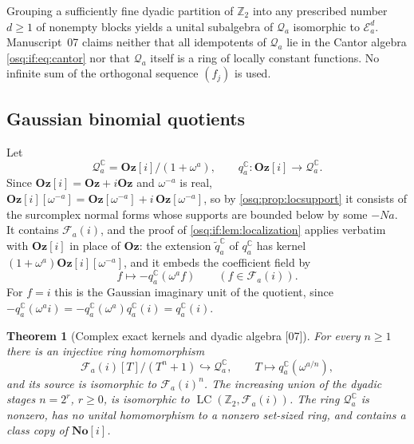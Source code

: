 \documentclass[11pt,letterpaper]{article}
\numberwithin{equation}{section}
\newtheorem{theorem}{Theorem}[section]
\theoremstyle{definition}
\theoremstyle{remark}
\theoremstyle{plain}
\newcommand{\No}{\mathbf{No}}
\newcommand{\Oz}{\mathbf{Oz}}
\newcommand{\SC}{\No[i]}
\newcommand{\GOz}{\Oz[i]}
\newcommand{\Z}{\mathbb Z}
\newcommand{\C}{\mathbb C}
\newcommand{\FF}{\mathscr F}         %
\newcommand{\EE}{\mathscr E}         %
\newcommand{\Qa}{\mathcal Q}         %
\newcommand{\LC}{\operatorname{LC}}
\newcommand{\src}[1]{\textup{\textsf{[#1]}}}
\begin{document}
Grouping a sufficiently fine dyadic partition of $\Z_2$ into any prescribed number $d\ge1$
of nonempty blocks yields a unital subalgebra of $\Qa_a$ isomorphic to $\EE_a^d$.
Manuscript~07 claims neither that all idempotents of $\Qa_a$ lie in the Cantor algebra
\eqref{osq:if:eq:cantor} nor that $\Qa_a$ itself is a ring of locally constant functions.
No infinite sum of the orthogonal sequence $(f_j)$ is used.

\subsection{Gaussian binomial quotients}\label{osq:if:sub:gaussian}

Let
\[
 \Qa_a^\C=\GOz/(1+\omega^a),\qquad q_a^\C:\GOz\to\Qa_a^\C .
\]
Since $\GOz=\Oz+i\Oz$ and $\omega^{-a}$ is real, $\GOz[\omega^{-a}]=\Oz[\omega^{-a}]
+i\,\Oz[\omega^{-a}]$, so by \cref{osq:prop:locsupport} it consists of the surcomplex normal
forms whose supports are bounded below by some $-Na$. It contains $\FF_a(i)$, and the proof of
\cref{osq:if:lem:localization} applies verbatim with $\GOz$ in place of $\Oz$: the
extension $\widetilde q_a^\C$ of $q_a^\C$ has kernel $(1+\omega^a)\GOz[\omega^{-a}]$, and
it embeds the coefficient field by
\[
 f\longmapsto-q_a^\C(\omega^af)\qquad(f\in\FF_a(i)).
\]
For $f=i$ this is the Gaussian imaginary unit of the quotient, since
$-q_a^\C(\omega^ai)=-q_a^\C(\omega^a)q_a^\C(i)=q_a^\C(i)$.

\begin{theorem}[Complex exact kernels and dyadic algebra \src{07}]
\label{osq:if:thm:complexkernel}
For every $n\ge1$ there is an injective ring homomorphism
\[
 \FF_a(i)[T]/(T^n+1)\hookrightarrow\Qa_a^\C,\qquad T\mapsto q_a^\C(\omega^{a/n}),
\]
and its source is isomorphic to $\FF_a(i)^n$. The increasing union of the dyadic stages
$n=2^r$, $r\ge0$, is isomorphic to $\LC(\Z_2,\FF_a(i))$. The ring $\Qa_a^\C$ is nonzero,
has no unital homomorphism to a nonzero set-sized ring, and contains a class copy of $\SC$.
\end{theorem}
\end{document}
